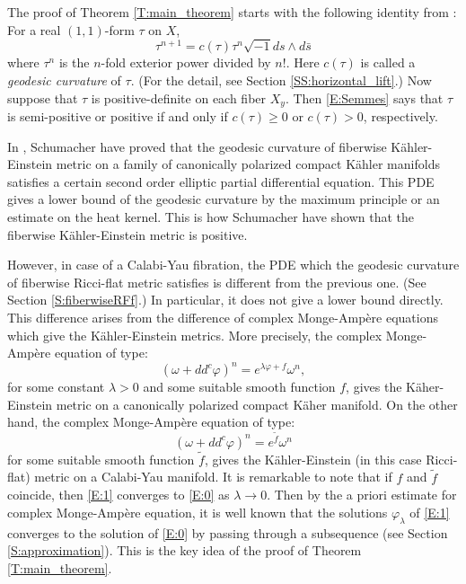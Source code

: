 \documentclass{amsart}
\theoremstyle{definition}
\numberwithin{equation}{section}
\begin{document}
The proof of Theorem \ref{T:main_theorem} starts with the following identity from \cite{Semmes}: For a real $(1,1)$-form $\tau$ on $X$,
\begin{equation*}\label{E:Semmes}
\tau^{n+1}
=
c(\tau)\tau^n{\sqrt{-1}} ds\wedge d\bar s
\end{equation*}
where $\tau^n$ is the $n$-fold exterior power divided by $n!$. Here $c(\tau)$ is called a \emph{geodesic curvature} of $\tau$. (For the detail, see Section \ref{SS:horizontal_lift}.) Now suppose that $\tau$ is positive-definite on each fiber $X_y$. Then \eqref{E:Semmes} says that $\tau$ is semi-positive or positive if and only if $c(\tau)\ge0$ or $c(\tau)>0$, respectively.

In \cite{Schumacher}, Schumacher have proved that the geodesic curvature of fiberwise K\"ahler-Einstein metric on a family of canonically polarized compact K\"ahler manifolds satisfies a certain second order elliptic partial differential equation. This PDE gives a lower bound of the geodesic curvature by the maximum principle or an estimate on the heat kernel. This is how Schumacher have shown that the fiberwise K\"ahler-Einstein metric is positive. 

However, in case of a Calabi-Yau fibration, the PDE which the geodesic curvature of fiberwise Ricci-flat metric satisfies is different from the previous one. (See Section \ref{S:fiberwiseRFf}.) In particular, it does not give a lower bound directly. This difference arises from the difference of complex Monge-Amp\`ere equations which give the K\"ahler-Einstein metrics. More precisely, the complex Monge-Amp\`ere equation of type:
\begin{equation}\label{E:1}
{\left({\omega+dd^c{\varphi}}\right)}^n
=
e^{\lambda{\varphi}+f}\omega^n,
\end{equation}
for some constant $\lambda>0$ and some suitable smooth function $f$, gives the K\"aher-Einstein metric on a canonically polarized compact K\"aher manifold. On the other hand, the complex Monge-Amp\`ere equation of type:
\begin{equation}\label{E:0}
{\left({\omega+dd^c{\varphi}}\right)}^n
=
e^{\tilde{f}}\omega^n
\end{equation}
for some suitable smooth function $\tilde f$, gives the K\"ahler-Einstein (in this case Ricci-flat) metric on a Calabi-Yau manifold. It is remarkable to note that if $f$ and $\tilde f$ coincide,  then \eqref{E:1} converges to \eqref{E:0} as $\lambda\rightarrow0$.
Then by the a priori estimate for complex Monge-Amp\`ere equation, it is well known that the solutions ${\varphi}_\lambda$ of \eqref{E:1} converges to the solution  of \eqref{E:0} by passing through a subsequence (see Section \ref{S:approximation}). 
This is the key idea of the proof of Theorem \ref{T:main_theorem}.
\medskip
\end{document}
